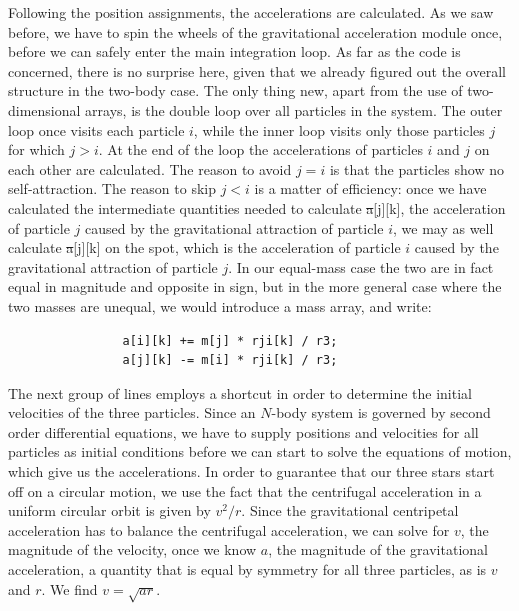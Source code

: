 Following the position assignments, the accelerations are calculated.
As we saw before, we have to spin the wheels of the gravitational
acceleration module once, before we can safely enter the main
integration loop.  As far as the code is concerned, there is no
surprise here, given that we already figured out the overall structure
in the two-body case.  The only thing new, apart from the use of
two-dimensional arrays, is the double loop over all particles in the
system.  The outer loop once visits each particle $i$, while the inner
loop visits only those particles $j$ for which $j>i$.  At the end of
the loop the accelerations of particles $i$ and $j$ on each other are
calculated.  The reason to avoid $j=i$ is that the particles show no
self-attraction.  The reason to skip $j<i$ is a matter of efficiency:
once we have calculated the intermediate quantities needed to
calculate {\st a[j][k]}, the acceleration of particle $j$ caused by
the gravitational attraction of particle $i$, we may as well calculate
{\st a[j][k]} on the spot, which is the acceleration of particle $i$
caused by the gravitational attraction of particle $j$.  In our
equal-mass case the two are in fact equal in magnitude and opposite in
sign, but in the more general case where the two masses are unequal,
we would introduce a mass array, and write:

\begin{small}
\begin{verbatim}
                a[i][k] += m[j] * rji[k] / r3;
                a[j][k] -= m[i] * rji[k] / r3;
\end{verbatim}
\end{small}

The next group of lines employs a shortcut in order to determine the
initial velocities of the three particles.  Since an $N$-body system
is governed by second order differential equations, we have to supply
positions and velocities for all particles as initial conditions
before we can start to solve the equations of motion, which give us
the accelerations.  In order to guarantee that our three stars start
off on a circular motion, we use the fact that the centrifugal
acceleration in a uniform circular orbit is given by $v^2/r$.  Since
the gravitational centripetal acceleration has to balance the
centrifugal acceleration, we can solve for $v$, the magnitude of the
velocity, once we know $a$, the magnitude of the gravitational
acceleration, a quantity that is equal by symmetry for all three
particles, as is $v$ and $r$.  We find $v = \sqrt{ar}$.

